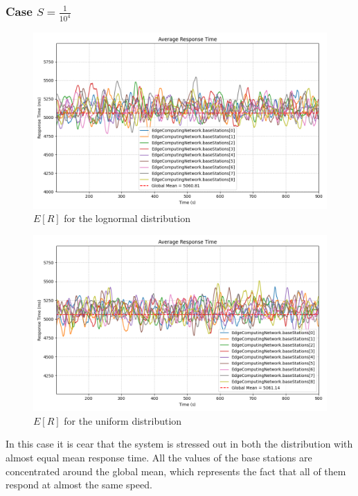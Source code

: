 \documentclass{report}
\begin{document}
\subsubsection*{Case $S=\frac{1}{10^4}$}

\begin{figure}[H]
    \centering
    \includegraphics[width=\textwidth]{img/plots/log_1e4_B/resptime.png}
    \caption{$E[R]$ for the lognormal distribution}
\end{figure}

\begin{figure}[H]
    \centering
    \includegraphics[width=\textwidth]{img/plots/uni_1e4_B/resptime.png}
    \caption{$E[R]$ for the uniform distribution}
\end{figure}

In this case it is cear that the system is stressed out in both the distribution with almost equal mean response time. All the values of the base stations are concentrated around the global mean, which represents the fact that all of them respond at almost the same speed.
\end{document}
